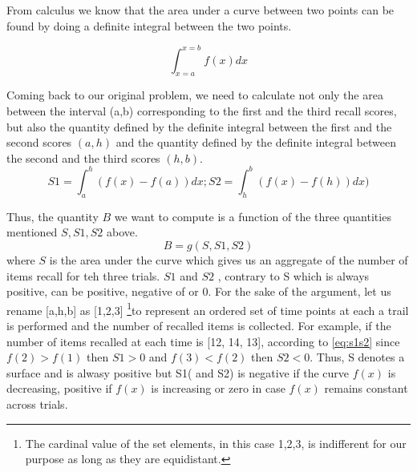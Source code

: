 \documentclass[11pt]{article}
\begin{document}
From calculus we know that the area under a curve between two points can be found by doing a definite integral between the two points. 

\begin{equation}
\int_{x=a}^{x=b}f(x)dx
\label{eq:defint}
\end{equation}

Coming back to our original problem, we need to calculate not only the area between the interval (a,b) corresponding to the first and the third recall scores, but also the quantity defined by the definite integral between the first and the second scores $(a,h)$ and the quantity defined by the definite integral between the second and the third scores $(h,b)$.
\begin{equation}
S1= \int_{a}^{h}(f(x) - f(a))dx ; S2= \int_{h}^{b}(f(x)-f(h))dx)
\label{eq:s1s2}
\end{equation}

Thus, the quantity $B$ we want to compute is a function of the three quantities mentioned $S,S1,S2$ above. 
\begin{equation}
B = g(S,S1,S2)
\label{eq:buk}
\end{equation}
where $S$ is the area under the curve which gives us an aggregate of the number of items recall for teh three trials. $S1$ and $S2$ , contrary to S which is always positive, can be positive, negative of or 0. For the sake of the argument, let us rename [a,h,b] as [1,2,3] \footnote{The cardinal value of the set elements, in this case 1,2,3, is indifferent for our purpose as long as they are equidistant.}to represent an ordered set of time points at each a trail is performed and the number of recalled items is collected. For example, if the number of items recalled at each time is [12, 14, 13], according to \ref{eq:s1s2} since $f(2) > f(1)$ then $S1>0$ and $f(3) < f(2)$ then $S2<0$. Thus, S denotes a surface and is alwasy positive but S1( and S2) is negative if the curve $f(x)$ is decreasing, positive if $f(x)$ is increasing or zero in case $f(x)$ remains constant across trials.
\end{document}
